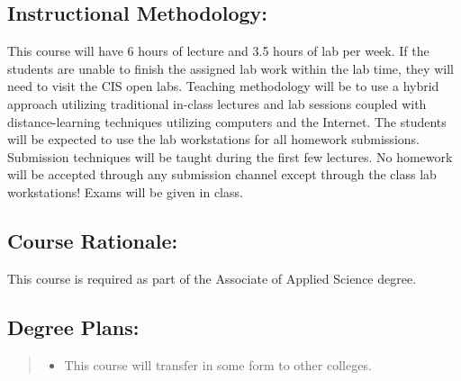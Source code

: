 \documentclass[a4paper]{article}
\begin{document}
\subsection{Instructional Methodology:%
  \label{instructional-methodology}%
}

This course will have 6 hours of lecture and 3.5 hours of lab per week. If
the students are unable to finish the assigned lab work within the lab time,
they will need to visit the CIS open labs. Teaching methodology will be to use
a hybrid approach utilizing traditional in-class lectures and lab sessions
coupled with distance-learning techniques utilizing computers and the
Internet. The students will be expected to use the lab workstations for all
homework submissions. Submission techniques will be taught during the first
few lectures. No homework will be accepted through any submission channel
except through the class lab workstations! Exams will be given in class.


\subsection{Course Rationale:%
  \label{course-rationale}%
}

This course is required as part of the Associate of Applied Science degree.


\subsection{Degree Plans:%
  \label{degree-plans}%
}
%
\begin{quote}
%
\begin{itemize}

\item This course will transfer in some form to other colleges.

\end{itemize}

\end{quote}
\end{document}
